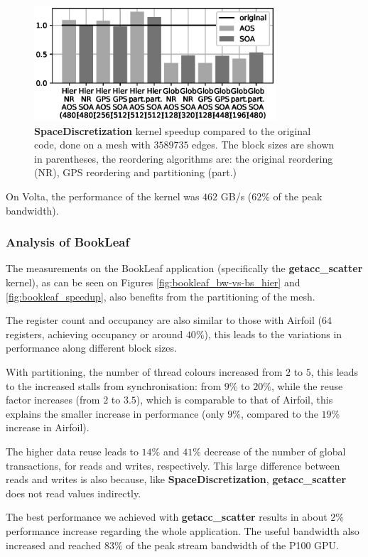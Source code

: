 \begin{figure}[Htbp]
  \centering
  \includegraphics[width=9cm]{fig/volna_speedup.eps}
  \caption{\textbf{SpaceDiscretization} kernel speedup compared to the original
  code, done on a mesh with $3589735$ edges. The block sizes are shown in
  parentheses, the reordering algorithms are: the original reordering (NR), GPS
  reordering and partitioning (part.)}
  \label{fig:volna_speedup}
\end{figure}

On Volta, the performance of the kernel was $462$ GB/s ($62\%$ of the peak
bandwidth).


\subsubsection{Analysis of BookLeaf}

The measurements on the BookLeaf application (specifically the
\textbf{getacc\_scatter} kernel), as can be seen on Figures
\ref{fig:bookleaf_bw-vs-bs_hier} and \ref{fig:bookleaf_speedup}, also benefits
from the partitioning of the mesh.

The register count and occupancy are also similar to those with Airfoil ($64$
registers, achieving occupancy or around $40\%$), this leads to the variations
in performance along different block sizes.

With partitioning, the number of thread colours increased from $2$ to $5$, this
leads to the increased stalls from synchronisation: from $9\%$ to $20\%$, while
the reuse factor increases (from $2$ to $3.5$), which is comparable to that of
Airfoil, this explains the smaller increase in performance (only $9\%$, compared
to the $19\%$ increase in Airfoil).

The higher data reuse leads to $14\%$ and $41\%$ decrease of the number of
global transactions, for reads and writes, respectively. This large difference
between reads and writes is also because, like \textbf{SpaceDiscretization},
\textbf{getacc\_scatter} does not read values indirectly.

The best performance we achieved with \textbf{getacc\_scatter} results in  about
$2\%$ performance increase regarding the whole application. The useful bandwidth
also increased and reached $83\%$ of the peak stream bandwidth of the P100 GPU.


